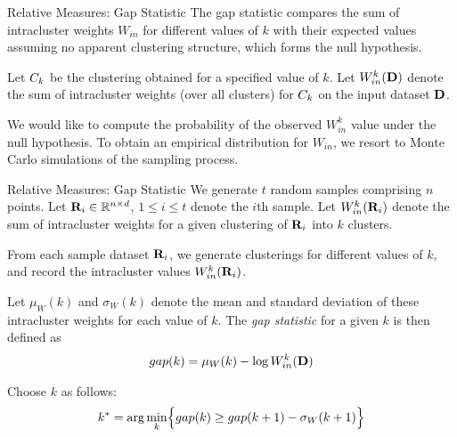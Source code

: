 \begin{frame}{Relative Measures: Gap Statistic}
The gap statistic compares the sum of
intracluster
weights $W_{in}$ 
for different values of $k$ with their expected values assuming
no apparent clustering structure, which forms the null hypothesis.

\bigskip
Let ${\relax C}_k$ be the clustering obtained for a specif\/{i}ed value of $k$.
Let $W_{in}^k(\mathbf{D})$ denote
the sum of intracluster weights (over all clusters) for ${\relax C}_k$ on the
input dataset $\mathbf{D}$.

\bigskip
We would like to compute the probability of the observed
$W_{in}^k$ value under the null hypothesis.
To obtain an empirical distribution for $W_{in}$, we resort to Monte
Carlo simulations of the sampling process.  
\end{frame}

\begin{frame}{Relative Measures: Gap Statistic}
We generate $t$
random samples comprising $n$ points.
Let $\mathbf{R}_i \in {\mathord{\mathbb R}}^{n \times d}$, $1 \le i \le t$ denote the $i$th sample.
Let $W_{in}^k(\mathbf{R}_i)$ denote the sum of intracluster weights for a
given clustering of $\mathbf{R}_i$ into $k$ clusters.

\medskip
From each sample
dataset $\mathbf{R}_i$, we generate clusterings for different values of $k$,
and record the intracluster values
$W_{in}^k(\mathbf{R}_i)$.

\medskip
Let $\mu_W(k)$ and $\sigma_W(k)$ denote the
mean and standard deviation of these intracluster weights for each
value of $k$.
The {\em gap statistic} for a given $k$ is then def\/{i}ned as
\begin{align*}
  gap(k) = \mu_W(k) - \log  W_{in}^k(\mathbf{D})
\end{align*}

\medskip
Choose $k$ as follows:
\begin{align*}
  k^* = \arg\min_k \Bigl\{ gap(k) \ge gap(k+1) - \sigma_W(k+1)\Bigr\}
\end{align*}
\end{frame}


